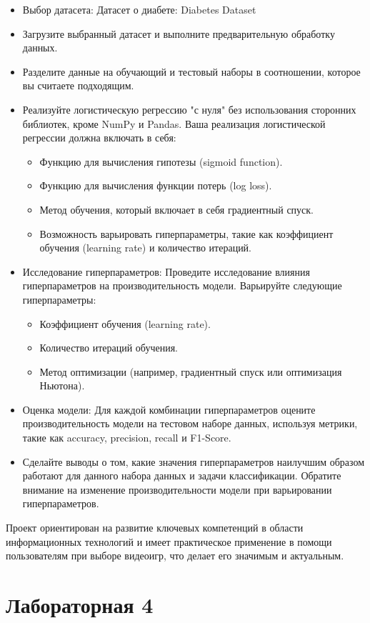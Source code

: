 \documentclass[12pt,onecolumn]{article}
\begin{document}
\begin{itemize}
  \item Выбор датасета: Датасет о диабете: Diabetes Dataset
  \item Загрузите выбранный датасет и выполните предварительную обработку данных. 
  \item Разделите данные на обучающий и тестовый наборы в соотношении, которое вы считаете подходящим.
  \item Реализуйте логистическую регрессию "с нуля" без использования сторонних библиотек, кроме NumPy и Pandas. Ваша реализация логистической регрессии должна включать в себя:
  \begin{itemize}
    \item Функцию для вычисления гипотезы (sigmoid function).
    \item Функцию для вычисления функции потерь (log loss).
    \item Метод обучения, который включает в себя градиентный спуск.
    \item Возможность варьировать гиперпараметры, такие как коэффициент обучения (learning rate) и количество итераций.
  \end{itemize}
  \item Исследование гиперпараметров: Проведите исследование влияния гиперпараметров на производительность модели. Варьируйте следующие гиперпараметры:
  \begin{itemize}
    \item Коэффициент обучения (learning rate).
    \item Количество итераций обучения.
    \item Метод оптимизации (например, градиентный спуск или оптимизация Ньютона).
  \end{itemize}
  \item Оценка модели: Для каждой комбинации гиперпараметров оцените производительность модели на тестовом наборе данных, используя метрики, такие как accuracy, precision, recall и F1-Score.
  \item Сделайте выводы о том, какие значения гиперпараметров наилучшим образом работают для данного набора данных и задачи классификации. Обратите внимание на изменение производительности модели при варьировании гиперпараметров.
  \end{itemize}
Проект ориентирован на развитие ключевых компетенций в области информационных технологий и имеет практическое применение в помощи пользователям при выборе видеоигр, что делает его значимым и актуальным.
\section{Лабораторная 4}
\end{document}
